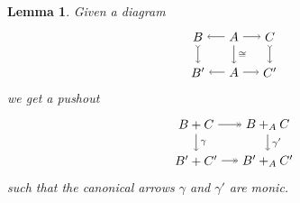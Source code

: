 \documentclass[11pt]{amsart}
\newtheorem{lem}[thm]{Lemma}
\theoremstyle{remark}
\theoremstyle{definition}
\begin{document}
\begin{lem} 
	\label{lem.helpful little lemma}
	Given a diagram
	\begin{equation} 
	\label{diag.helpful little lemma}
	\begin{tikzpicture}[baseline=(current  bounding  box.center)]
		\node (B) at (-1,1) {$B$};
		\node (A) at (0,1) {$A$};
		\node (C) at (1,1) {$C$};
		\node (B') at (-1,0) {$B'$};
		\node (A') at (0,0) {$A$};
		\node (C') at (1,0) {$C'$};
		\draw [->] (A) edge (B);
		\draw [font=\scriptsize,->] (A) edge node[right] {$\cong$} (A');
		\draw [->] (A) edge (C);
		\draw [->] (A') edge (B');
		\draw [->] (A') edge (C');
		\draw [>->] (B) edge (B');
		\draw [>->] (C) edge (C');
	\end{tikzpicture}
	\end{equation}
	we get a pushout
	\begin{equation}
	\label{diag.helpful pushout}
	\begin{tikzpicture}[baseline=(current  bounding  box.center)]
		\node (BC) at (0,1) {$B+C$};
		\node (BAC) at (2,1) {$B+_AC$};
		\node (BC') at (0,0) {$B'+C'$};
		\node (BAC') at (2,0) {$B'+_AC'$};
		\draw [->>] (BC) edge (BAC);
		\draw [font=\scriptsize,->] (BC) edge node[right] {$\gamma$} (BC');
		\draw [font=\scriptsize,->] (BAC) edge node[right] {$\gamma'$} (BAC');
		\draw [->>] (BC') edge (BAC');
	\end{tikzpicture}
	\end{equation}
	such that the canonical arrows $\gamma$ 
	and $\gamma'$ are monic.
\end{lem}
\end{document}
